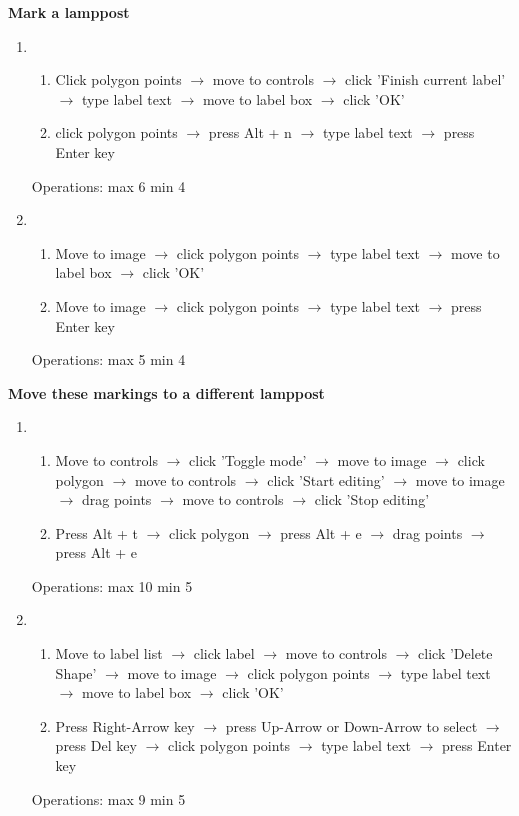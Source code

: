 \documentclass[a4paper,11pt,oneside]{article}
\begin{document}
{\bf Mark a lamppost}
\begin{enumerate}
    \item
    \begin{enumerate}
        \item Click polygon points $\rightarrow$ move to controls $\rightarrow$ click 'Finish current label' $\rightarrow$ type label text $\rightarrow$ move to label box $\rightarrow$ click 'OK'
        \item click polygon points $\rightarrow$ press Alt + n $\rightarrow$ type label text $\rightarrow$ press Enter key
    \end{enumerate}
    Operations: max 6 min 4
    \item
    \begin{enumerate}
        \item Move to image $\rightarrow$ click polygon points $\rightarrow$ type label text $\rightarrow$ move to label box $\rightarrow$ click 'OK'
        \item Move to image $\rightarrow$ click polygon points $\rightarrow$ type label text $\rightarrow$ press Enter key
    \end{enumerate}
    Operations: max 5 min 4
\end{enumerate}

{\bf Move these markings to a different lamppost}
\begin{enumerate}
    \item
    \begin{enumerate}
        \item Move to controls $\rightarrow$ click 'Toggle mode' $\rightarrow$ move to image $\rightarrow$ click polygon $\rightarrow$ move to controls $\rightarrow$ click 'Start editing' $\rightarrow$ move to image $\rightarrow$ drag points $\rightarrow$ move to controls $\rightarrow$ click 'Stop editing'
        \item Press Alt + t $\rightarrow$ click polygon $\rightarrow$ press Alt + e $\rightarrow$ drag points $\rightarrow$ press Alt + e
    \end{enumerate}
    Operations: max 10 min 5
    \item
    \begin{enumerate}
        \item Move to label list $\rightarrow$ click label $\rightarrow$ move to controls $\rightarrow$ click 'Delete Shape' $\rightarrow$ move to image $\rightarrow$ click polygon points $\rightarrow$ type label text $\rightarrow$ move to label box $\rightarrow$ click 'OK'
        \item Press Right-Arrow key $\rightarrow$ press Up-Arrow or Down-Arrow to select $\rightarrow$ press Del key $\rightarrow$ click polygon points $\rightarrow$ type label text $\rightarrow$ press Enter key
    \end{enumerate}
    Operations: max 9 min 5
\end{enumerate}
\end{document}
